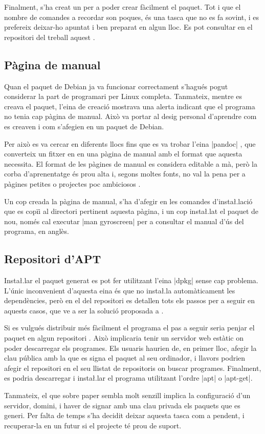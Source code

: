 Finalment, s'ha creat un  per a poder crear fàcilment el
paquet. Tot i que el nombre de comandes a recordar son poques, és una tasca que
no es fa sovint, i es prefereix deixar-ho apuntat i ben preparat en algun lloc.
Es pot consultar en el repositori del treball aquest .

\subsection{Pàgina de manual}

Quan el paquet de Debian ja va funcionar correctament s'hagués pogut considerar
la part de programari per Linux completa. Tanmateix, mentre es creava el paquet,
l'eina de creació mostrava una alerta indicant que el programa no tenia cap
pàgina de manual. Això va portar al desig personal d'aprendre com es creaven
i com s'afegien en un paquet de Debian.

Per això es va cercar en diferents llocs fins que es va trobar l'eina
\ord|pandoc| \cite{PandocTutorial},
que converteix un fitxer en  en una pàgina de manual amb el
format que aquesta necessita. El format de les pàgines de manual es considera
editable a mà, però la corba d'aprenentatge és prou alta i, segons moltes fonts,
no val la pena per a pàgines petites o projectes poc ambiciosos \cite{Manpage}.

Un cop creada la pàgina de manual, s'ha d'afegir en les comandes d'insta\l.lació
que es copïi al directori pertinent aquesta pàgina, i un cop insta\l.lat el
paquet de nou, només cal executar \ord|man gyroscreen| per a consultar el
manual d'ús del programa, en anglès.

\subsection{Repositori d'APT}

Insta\l.lar el paquet generat es pot fer utilitzant l'eina \ord|dpkg| sense cap
problema. L'únic inconvenient d'aquesta eina és que no insta\l.la automàticament
les dependències, però en el  del repositori es detallen tots els
passos per a seguir en aquests casos, que ve a ser la solució proposada a
\cite{dpkgHelp}.

Si es vulgués distribuir més fàcilment el programa el pas a seguir seria
penjar el paquet en algun repositori . Això implicaria tenir un servidor
web estàtic on poder descarregar els programes. Els usuaris haurien de, en primer
lloc, afegir la clau pública amb la que es signa el paquet al seu ordinador, i
llavors podrien afegir el repositori  en el seu llistat de repositoris
on buscar programes. Finalment, es podria descarregar i insta\l.lar el programa
utilitzant l'ordre \ord|apt| o \ord|apt-get|.

Tanmateix, el que sobre paper sembla molt senzill implica la configuració d'un
servidor, domini, i haver de signar amb una clau privada els paquets que es
generi. Per falta de temps s'ha decidit deixar aquesta tasca com a pendent, i
recuperar-la en un futur si el projecte té prou de suport.
